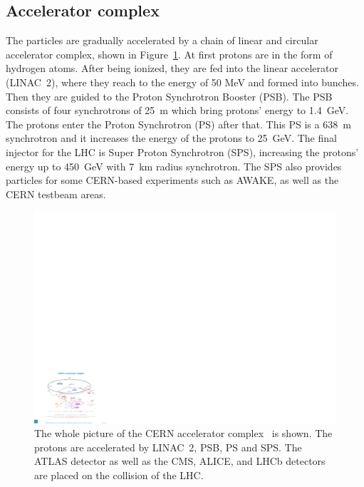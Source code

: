 \subsection{Accelerator complex}
The particles are gradually accelerated by a chain of linear and circular accelerator complex, shown in Figure~\ref{fig:accelerator}. At first protons are in the form of hydrogen atoms. After being ionized, they are fed into the linear accelerator (LINAC~2), where they reach to the energy of 50 MeV and formed into bunches. Then they are guided to the Proton Synchrotron Booster (PSB). The PSB consists of four synchrotrons of 25~m which bring protons' energy to 1.4~GeV. The protons enter the Proton Synchrotron (PS) after that. This PS is a 638~m synchrotron and it increases the energy of the protons to 25~GeV. The final injector for the LHC is Super Proton Synchrotron (SPS), increasing the protons' energy up to 450~GeV with 7~km radius synchrotron. The SPS also provides particles for some CERN-based experiments such as AWAKE, as well as the CERN testbeam areas. \\
\begin{figure}[tbp]
\begin{center}
 \includegraphics[width=1.1\textwidth,keepaspectratio]{figures/detector/CERN}
\caption{
The whole picture of the CERN accelerator complex~\cite{accelerator} is shown. The protons are accelerated by LINAC~2, PSB, PS and SPS.
The ATLAS detector as well as the CMS, ALICE, and LHCb detectors are placed on the collision of the LHC.
}
\label{fig:accelerator}
\end{center}
\end{figure}
